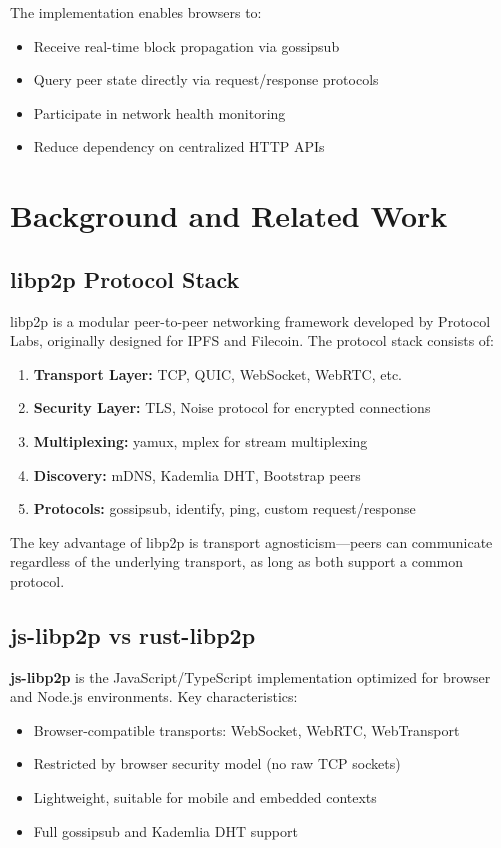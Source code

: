 \documentclass[11pt,a4paper]{article}
\begin{document}
The implementation enables browsers to:
\begin{itemize}
    \item Receive real-time block propagation via gossipsub
    \item Query peer state directly via request/response protocols
    \item Participate in network health monitoring
    \item Reduce dependency on centralized HTTP APIs
\end{itemize}

\section{Background and Related Work}

\subsection{libp2p Protocol Stack}

libp2p is a modular peer-to-peer networking framework developed by Protocol Labs, originally designed for IPFS and Filecoin. The protocol stack consists of:

\begin{enumerate}
    \item \textbf{Transport Layer:} TCP, QUIC, WebSocket, WebRTC, etc.
    \item \textbf{Security Layer:} TLS, Noise protocol for encrypted connections
    \item \textbf{Multiplexing:} yamux, mplex for stream multiplexing
    \item \textbf{Discovery:} mDNS, Kademlia DHT, Bootstrap peers
    \item \textbf{Protocols:} gossipsub, identify, ping, custom request/response
\end{enumerate}

The key advantage of libp2p is transport agnosticism---peers can communicate regardless of the underlying transport, as long as both support a common protocol.

\subsection{js-libp2p vs rust-libp2p}

\textbf{js-libp2p} is the JavaScript/TypeScript implementation optimized for browser and Node.js environments. Key characteristics:

\begin{itemize}
    \item Browser-compatible transports: WebSocket, WebRTC, WebTransport
    \item Restricted by browser security model (no raw TCP sockets)
    \item Lightweight, suitable for mobile and embedded contexts
    \item Full gossipsub and Kademlia DHT support
\end{itemize}
\end{document}
